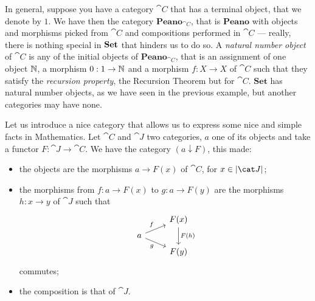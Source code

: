 \begin{remark}
In general, suppose you have a category \(\cat C\) that has a terminal object, that we denote by \(1\).  We have then the category \(\mathbf{Peano}_{\cat C}\), that is \(\mathbf{Peano}\) with objects and morphisms picked from \(\cat C\) and compositions performed in \(\cat C\) --- really, there is nothing special in \(\mathbf{Set}\) that hinders us to do so. A {\em natural number object} of \(\cat C\) is any of the initial objects of \(\mathbf{Peano}_{\cat C}\), that is an assignment of one object \(\mathbb N\), a morphism \(0 : 1 \to \mathbb N\) and a morphism \(f : X \to X\) of \(\cat C\) such that they satisfy the {\em recursion property}, the Recursion Theorem but for \(\cat C\). \(\mathbf{Set}\) has natural number objects, as we have seen in the previous example, but another categories may have none.  
\end{remark}

\begin{construction}
Let us introduce a nice category that allows us to express some nice and simple facts in Mathematics. Let \(\cat C\) and \(\cat J\) two categories, \(a\) one of its objects and take a functor \(F : \cat J \to \cat C\). We have the category \((a \downarrow F)\), this made:
\begin{itemize}
\item the objects are the morphisms \(a \to F(x)\) of \(\cat C\), for \(x \in \obj{\cat J}\);
\item the morphisms from \(f : a \to F(x)\) to \(g : a \to F(y)\) are the morphisms \(h : x \to y\) of \(\cat J\) such that
\[\begin{tikzcd}[row sep=tiny]
 & F(x) \ar["{F(h)}", dd] \\
a \ar["f", ur] \ar["g", dr, swap] \\
 & F(y)
\end{tikzcd}\]
commutes;
\item the composition is that of \(\cat J\). 
\end{itemize}
\end{construction}

